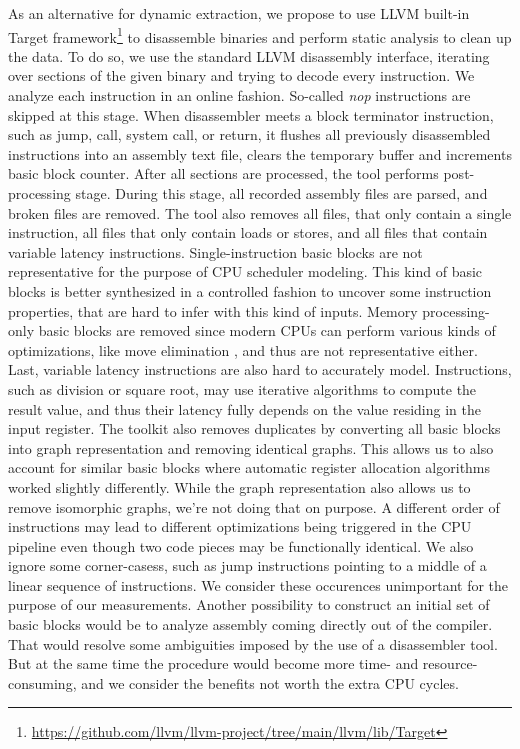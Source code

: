 As an alternative for dynamic extraction, we propose to use LLVM built-in Target framework\footnote{\url{https://github.com/llvm/llvm-project/tree/main/llvm/lib/Target}}
to disassemble binaries and perform static analysis to clean up the data. To do so, we use the standard 
LLVM disassembly interface, iterating over sections of the given binary and trying to decode every 
instruction. We analyze each instruction in an online fashion. So-called \textit{nop} instructions are skipped 
at this stage. When disassembler meets a block terminator instruction, such as jump, call, system 
call, or return, it flushes all previously disassembled instructions into an assembly text file, 
clears the temporary buffer and increments basic block counter. After all sections are processed, 
the tool performs post-processing stage. During this stage, all recorded assembly files are parsed, 
and broken files are removed. The tool also removes all files, that only contain a single instruction, 
all files that only contain loads or stores, and all files that contain variable latency instructions. 
Single-instruction basic blocks are not representative for the purpose of CPU scheduler modeling. 
This kind of basic blocks is better synthesized in a controlled fashion to uncover some instruction 
properties, that are hard to infer with this kind of inputs. Memory processing-only basic blocks are 
removed since modern CPUs can perform various kinds of optimizations, like move 
elimination \cite{Intel64IA322022}, and thus are not representative either. Last, variable latency 
instructions are also hard to accurately model. Instructions, such as division or square root, may 
use iterative algorithms to compute the result value, and thus their latency fully depends on the 
value residing in the input register. The toolkit also removes duplicates by converting all basic 
blocks into graph representation and removing identical graphs. This allows us to also account for 
similar basic blocks where automatic register allocation algorithms worked slightly differently. 
While the graph representation also allows us to remove isomorphic graphs, we're not doing that on purpose. 
A different order of instructions may lead to different optimizations being triggered in the CPU pipeline 
even though two code pieces may be functionally identical. We also ignore some corner-casess, such as
jump instructions pointing to a middle of a linear sequence of instructions. We consider these occurences
unimportant for the purpose of our measurements. Another possibility to construct an initial set of basic
blocks would be to analyze assembly coming directly out of the compiler. That would resolve some ambiguities
imposed by the use of a disassembler tool. But at the same time the procedure would become more time-
and resource-consuming, and we consider the benefits not worth the extra CPU cycles.


